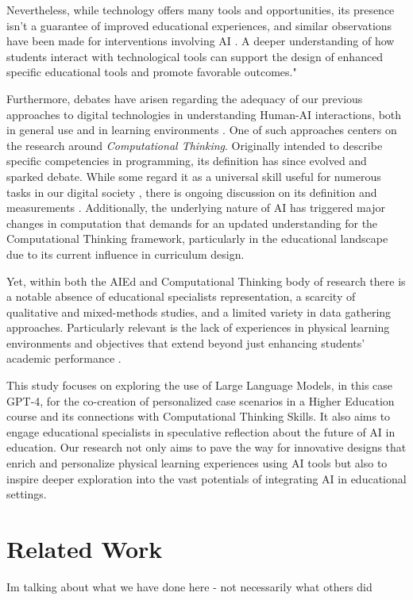 \documentclass[sn-mathphys, Numbered]{sn-jnl}%
\theoremstyle{thmstyleone}%
\theoremstyle{thmstyletwo}%
\theoremstyle{thmstylethree}%
\begin{document}
Nevertheless, while technology offers many tools and opportunities, its presence isn't a guarantee of improved educational experiences, and similar observations have been made for interventions involving AI \parencite{holmes_state_2022}.  A deeper understanding of how students interact with technological tools can support the design of enhanced specific educational tools and promote favorable outcomes." 

Furthermore, debates have arisen regarding the adequacy of our previous approaches to digital technologies in understanding Human-AI interactions, both in general use and in learning environments . One of such approaches centers on the research around \textit{Computational Thinking}. Originally intended to describe specific competencies in programming, its definition has since evolved and sparked debate. While some regard it as a universal skill useful for numerous tasks in our digital society \parencite{wing_computational_2006}, there is ongoing discussion on its definition and measurements \parencite{MorenoLen2018OnCT} . Additionally, the underlying nature of AI has triggered major changes in computation that demands for an updated understanding for the Computational Thinking framework, particularly in the educational landscape due to its current influence in curriculum design\parencite{tedre_ct_2021}. 

Yet, within both the AIEd and Computational Thinking body of research there is a notable absence of educational specialists representation, a scarcity of qualitative and mixed-methods studies, and a limited variety in data gathering approaches. Particularly relevant is the lack of experiences in physical learning environments and objectives that extend beyond just enhancing students' academic performance \parencite{zawacki-richter_systematic_2019, holmes_state_2022, grover_computational_2013}. 

This study focuses on exploring the use of Large Language Models, in this case GPT-4, for the co-creation of personalized case scenarios in a Higher Education course and its connections with Computational Thinking Skills. It also aims to engage educational specialists in speculative reflection about the future of AI in education. Our research not only aims to pave the way for innovative designs that enrich and personalize physical learning experiences using AI tools but also to inspire deeper exploration into the vast potentials of integrating AI in educational settings. 

\section{Related Work}\label{Related Work}
Im talking about what we have done here - not necessarily what others did
\end{document}
